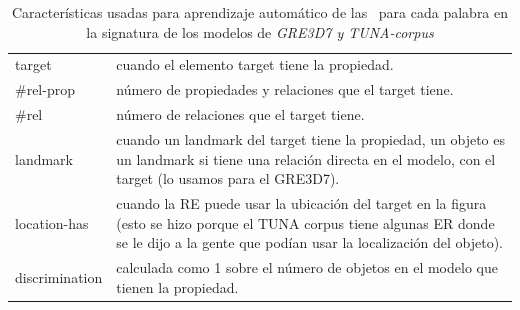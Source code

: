 \begin{small}
\begin{table}[h]
\begin{center}
\begin{tabular}{|l|p{10cm}|}
\hline
target & cuando el elemento target tiene la propiedad. \\
\#rel-prop & n\'umero de propiedades y relaciones que el target tiene.\\
\#rel & n\'umero de relaciones que el target tiene. \\
landmark & cuando un landmark del target tiene la propiedad, un objeto es un landmark si tiene una relaci\'on directa en el modelo, con el target (lo usamos para el GRE3D7).\\
location-has & cuando la RE puede usar la ubicaci\'on del target en la figura (esto se hizo porque el TUNA corpus tiene algunas ER donde se le dijo a la gente que pod\'ian usar la localizaci\'on del objeto).\\
discrimination & calculada como 1 sobre el n\'umero de objetos en el modelo que tienen la propiedad.  \\
\hline
\end{tabular}
\caption{Caracter\'isticas usadas para aprendizaje autom\'atico de las \puse~para cada palabra en la signatura de los modelos de \textit{GRE3D7 y TUNA-corpus} \label{features}}
\end{center}
\end{table}
\end{small}



